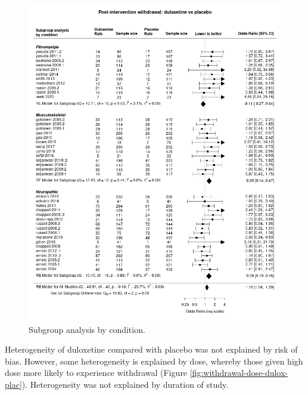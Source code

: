 \documentclass{report}\usepackage[]{graphicx}\usepackage[]{color}
\begin{document}
\begin{figure}

\includegraphics[width=\textwidth]{img/withdrawal-condition-duloxetine-placebo-forest.png}
\caption[Withdrawal by condition: duloxetine]{
Subgroup analysis by condition. 
}
\label{fig:withdrawal-condition-dulox-plac}
\end{figure}

Heterogeneity of duloxetine compared with placebo was not explained by risk of bias. However, some heterogeneity is explained by dose, whereby those given high dose more likely to experience withdrawal (Figure \ref{fig:withdrawal-dose-dulox-plac}). Heterogeneity was not explained by duration of study.
\end{document}
